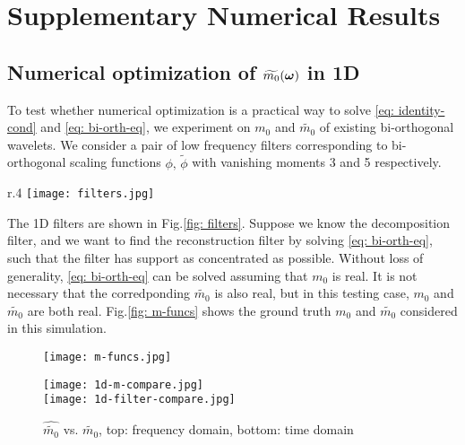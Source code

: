 \section{Supplementary Numerical Results}\label{app: supp-numerical}
\subsection{Numerical optimization of $\widetilde{m_{0}}(\boldsymbol{\omega})$ in 1D}\label{subsec: 1D-opt}
To test whether numerical optimization is a practical way to solve \eqref{eq: identity-cond} and \eqref{eq: bi-orth-eq}, we experiment on $m_0$ and $\widetilde{m_0}$ of existing bi-orthogonal wavelets. We consider a pair of low frequency filters corresponding to bi-orthogonal scaling functions $\phi,\, \tilde{\phi}$ with vanishing moments 3 and 5 respectively. 

\begin{wrapfigure}{r}{.4\textwidth}
\texttt{[image: filters.jpg]}
\caption{1D filters, up: LoD, down: LoR}
\label{fig: filters}
\end{wrapfigure}
The 1D filters are shown in Fig.\ref{fig: filters}. Suppose we know the decomposition filter, and we want to find the reconstruction filter by solving \eqref{eq: bi-orth-eq}, such that the filter has support as concentrated as possible. 
Without loss of generality, \eqref{eq: bi-orth-eq} can be solved assuming that $m_0$ is real.
It is not necessary that the corredponding $\widetilde{m_0}$ is also real, but in this testing case, $m_0$ and $\widetilde{m_0}$ are both real.
Fig.\ref{fig: m-funcs} shows the ground truth $m_0$ and $\widetilde{m_0}$ considered in this simulation. %
\begin{figure}%
\begin{minipage}[t]{.45\textwidth}
\texttt{[image: m-funcs.jpg]}
\caption{$m_0(\omega)$ and $\widetilde{m_0}(\omega)$}
\label{fig: m-funcs}
\end{minipage}
\hfill
\begin{minipage}[t]{.45\textwidth}
\vbox{
\texttt{[image: 1d-m-compare.jpg]}\\
\texttt{[image: 1d-filter-compare.jpg]}
}
\caption{$\widehat{\widetilde{m_0}}$ vs. $\widetilde{m_0}$, top: frequency domain, bottom: time domain}
\label{fig: 1d-compare}
\end{minipage}
\end{figure}

